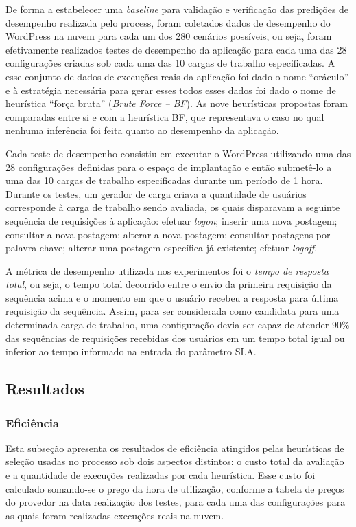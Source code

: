\documentclass[12pt]{article}
\begin{document}
De forma a estabelecer uma \emph{baseline} para validação e verificação das 
predições de desempenho realizada pelo process, foram coletados dados de desempenho do WordPress na nuvem para cada um dos 280 cenários possíveis, ou seja, foram efetivamente realizados testes de desempenho da aplicação para cada uma das 28 configurações criadas sob cada uma das 10 cargas de trabalho especificadas. A esse conjunto
de dados de execuções reais da aplicação foi dado o nome ``oráculo'' e à estratégia necessária para gerar esses todos esses dados foi dado o nome de heurística ``força bruta'' ({\em Brute Force -- BF}). As nove heurísticas propostas foram comparadas entre si e com a heurística BF, que representava o caso no qual nenhuma inferência foi feita quanto ao desempenho da aplicação. 

Cada teste de desempenho consistiu em executar o WordPress utilizando uma das 28 configurações definidas para o espaço de implantação e então submetê-lo a uma das 10 cargas de trabalho especificadas durante um período de 1 hora. Durante os testes, um gerador de carga criava a quantidade de usuários corresponde à carga de trabalho sendo avaliada, os quais disparavam a seguinte sequência de requisições à aplicação: efetuar \emph{logon}; inserir uma nova postagem; consultar a nova postagem; alterar a nova postagem; consultar postagens por palavra-chave; alterar uma postagem específica já existente; efetuar \emph{logoff}. 

A métrica de desempenho utilizada nos experimentos foi o {\em tempo de resposta total}, ou 
seja, o tempo total decorrido entre o envio da primeira requisição da sequência 
acima e o momento em que o usuário recebeu a resposta para última requisição da
sequência. Assim, para ser considerada como candidata para uma determinada carga de trabalho, uma configuração devia 
ser capaz de atender 90\% das sequências de requisições recebidas dos usuários em um tempo total igual ou inferior ao tempo informado na entrada do parâmetro SLA.

\subsection{Resultados}

\subsubsection{Eficiência}
Esta subseção apresenta os resultados de eficiência atingidos pelas heurísticas de seleção usadas 
no processo sob dois aspectos distintos: o custo total da avaliação e a quantidade de execuções realizadas por cada heurística. Esse custo foi calculado somando-se o preço da hora de utilização, conforme a tabela 
de preços do provedor na data realização dos testes, para cada uma das configurações 
para as quais foram realizadas execuções reais na nuvem. 
\end{document}
